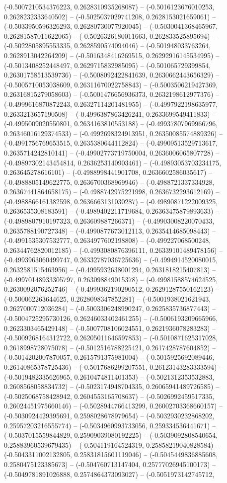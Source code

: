 (-0.5007210534376223, 0.2628310935268087) -- (-0.5016123676010253, 0.2628232333640502) -- (-0.5025037029741208, 0.2628153021659061) -- (-0.5033950596326293, 0.26280730077920045) -- (-0.5030041368465967, 0.26281587011622065) -- (-0.5026326180011663, 0.262833525895694) -- (-0.5022805895553335, 0.2628590574094046) -- (-0.501948033763264, 0.2628913042264209) -- (-0.5016348416269515, 0.26292916145534995) -- (-0.5013408252448497, 0.2629715832985095) -- (-0.501065729399854, 0.26301758513539736) -- (-0.5008092422841639, 0.2630662443656329) -- (-0.5005710053038609, 0.26311670022758843) -- (-0.5003506219427369, 0.26316815279058603) -- (-0.5001476656936373, 0.2632198612977376) -- (-0.4999616870872243, 0.26327114201481955) -- (-0.4997922198635977, 0.2633213657190508) -- (-0.4996387863426241, 0.2633699549411833) -- (-0.4995009020550801, 0.2634163810553188) -- (-0.49937807969966796, 0.26346016129374533) -- (-0.4992698324913951, 0.26350085574889326) -- (-0.4991756769653515, 0.2635380644112824) -- (-0.49909513529713617, 0.2635714242810141) -- (-0.49902773719750004, 0.2636006065807728) -- (-0.49897302143454814, 0.2636253140903461) -- (-0.49893053703234175, 0.263645278616101) -- (-0.4988998441901708, 0.2636602586035617) -- (-0.4988805149622775, 0.2636700368969946) -- (-0.4988721337334928, 0.26367441864658175) -- (-0.4988742975221998, 0.2636732293612169) -- (-0.4988866161382598, 0.2636663131030287) -- (-0.49890871222009325, 0.2636535308183591) -- (-0.4989402211719684, 0.26363475879893633) -- (-0.4989807910197323, 0.263609887266371) -- (-0.49903008220070433, 0.2635788190727348) -- (-0.4990877673012113, 0.2635414685098443) -- (-0.4991535307532777, 0.2634977602198808) -- (-0.499227068500248, 0.26344762820012185) -- (-0.4993080876396111, 0.26339101489478156) -- (-0.4993963060499747, 0.26332787036725636) -- (-0.4994914520080015, 0.2632581515463956) -- (-0.4995932638001294, 0.2631818215407813) -- (-0.49970148933305797, 0.263098849015378) -- (-0.49981588574624525, 0.2630092076252746) -- (-0.4999362190290512, 0.26291287550162123) -- (-0.500062263644625, 0.2628098347852281) -- (-0.5001938021621943, 0.2627000712036284) -- (-0.5003306248990247, 0.2625835736877443) -- (-0.5004725295730126, 0.26246033402461255) -- (-0.5006193209665966, 0.2623303465429148) -- (-0.5007708106024551, 0.2621936078283283) -- (-0.5009268164312722, 0.26205011646597853) -- (-0.5010871625317028, 0.2618998728075078) -- (-0.5012516788225421, 0.2617428787604852) -- (-0.5014202007870057, 0.2615791375981004) -- (-0.5015925692089446, 0.26140865378725436) -- (-0.5017686299207551, 0.26123143283333594) -- (-0.5019482335626965, 0.2610474811401353) -- (-0.5021312353532883, 0.2608568058834732) -- (-0.5023174948704335, 0.26065941489726585) -- (-0.5025068758428942, 0.2604553165708637) -- (-0.5026992459517335, 0.26024451975660146) -- (-0.5028944766413299, 0.26002703368660157) -- (-0.5030924429395691, 0.2598028678979654) -- (-0.5032930232868202, 0.25957203216555774) -- (-0.5034960993733056, 0.259334536441671) -- (-0.5037015559844829, 0.25909039080192225) -- (-0.5039092808540654, 0.25883960539679435) -- (-0.504119164524319, 0.25858219040828584) -- (-0.5043311002132805, 0.25831815601119046) -- (-0.5045449836885608, 0.2580475123385673) -- (-0.504760713147404, 0.25777026945100173) -- (-0.5049781891026888, 0.2574864373093027) -- (-0.5051973142745712, 